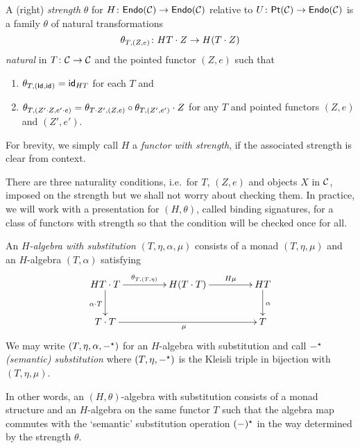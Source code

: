 \documentclass[acmsmall,review]{acmart}\settopmatter{printfolios=true,printccs=false,printacmref=false}
\theoremstyle{acmdefinition}
\begin{document}
  \begin{definition}\label{def:strength}
  A (right) \emph{strength} $\theta$ for $H\colon \Endo{\catC} \to\Endo{\catC}$ relative to $U\colon \Pt{\catC} \to \Endo{\catC}$ is a family $\theta$ of natural transformations
  \[
    \theta_{T, (Z, e)} \colon H T \fcomp Z \to H(T \fcomp Z)
  \]
  \emph{natural} in $T\colon \catC \to \catC$ and the pointed functor $(Z, e)$ such that 
  \begin{enumerate}
    \item $\theta_{T, (\Id, \idfunc)} = \idfunc[HT]$ for each $T$ and
    \item $\theta_{T, (Z' \fcomp Z, e' \fcomp e)} = \theta_{T \fcomp Z', (Z, e)} \comp \theta_{T, (Z', e')} \fcomp Z$ for any $T$ and pointed functors $(Z, e)$ and $(Z', e')$.
  \end{enumerate}
  For brevity, we simply call $H$ a \emph{functor with strength}, if the associated strength is clear from context.
\end{definition}
There are three naturality conditions, i.e.\ for $T$, $(Z, e)$ and objects $X$ in $\catC$, imposed on the strength but we shall not worry about checking them.
In practice, we will work with a presentation for $(H, \theta)$, called binding signatures, for a class of functors with strength so that the condition will be checked once for all.
\begin{definition}\label{def:substitution-algebra}
  An \emph{$H$-algebra with substitution} $(T, \eta, \alpha, \mu)$ consists of a monad $(T, \eta, \mu)$ and an $H$-algebra $(T, \alpha)$ satisfying
  \begin{equation}\label{dig:substitution}
    \vcenter{
      \xymatrix@C+2em{
        HT\fcomp T \ar[d]_{\alpha \fcomp T} \ar[r]^-{\theta_{T, (T, \eta)}} & H(T\fcomp T) \ar[r]^-{H\mu} & HT \ar[d]^{\alpha} \\
        T\fcomp T \ar[rr]_{\mu} & & T
      }
    }
  \end{equation}
  We may write $(T, \eta, \alpha, \blank^\star)$ for an $H$-algebra with substitution and call $\blank^\star$ \emph{(semantic) substitution} where $(T, \eta, \blank^\star)$ is the Kleisli triple in bijection with $(T, \eta, \mu)$.
\end{definition}
In other words, an $(H, \theta)$-algebra with substitution consists of a monad structure and an $H$-algebra on the same functor $T$ such that the algebra map commutes with the `semantic' substitution operation $(\blank)^\star$ in the way determined by the strength $\theta$.
\end{document}
